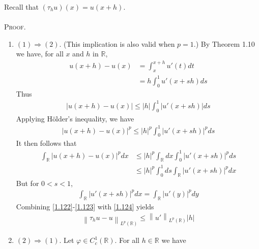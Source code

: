 \documentclass[a4paper,oneside]{book}
\numberwithin{equation}{chapter}
\begin{document}
Recall that $\left( {{\tau _h}u} \right)\left( x \right) = u\left( {x + h} \right)$.\\
\\
\textsc{Proof.} 
\begin{enumerate}
\item $\left( 1 \right) \Rightarrow \left( 2 \right)$. (This implication is also valid when $p=1$.) By Theorem 1.10 we have, for all $x$ and $h$ in $\mathbb{R}$,
\begin{align}
u\left( {x + h} \right) - u\left( x \right) &= \int_x^{x + h} {u'\left( t \right)dt} \\
 &= h\int_0^1 {u'\left( {x + sh} \right)ds} 
\end{align}
Thus
\begin{align}
\left| {u\left( {x + h} \right) - u\left( x \right)} \right| \le \left| h \right|\int_0^1 {\left| {u'\left( {x + sh} \right)} \right|ds} 
\end{align}
Applying H\"{o}lder's inequality, we have
\begin{align}
{\left| {u\left( {x + h} \right) - u\left( x \right)} \right|^p} \le {\left| h \right|^p}\int_0^1 {{{\left| {u'\left( {x + sh} \right)} \right|}^p}ds} 
\end{align}
It then follows that
\begin{align}
\label{1.122}
\int_{\mathbb{R}} {{{\left| {u\left( {x + h} \right) - u\left( x \right)} \right|}^p}dx}  &\le {\left| h \right|^p}\int_{\mathbb{R}} {dx\int_0^1 {{{\left| {u'\left( {x + sh} \right)} \right|}^p}ds} } \\
& \le {\left| h \right|^p}\int_0^1 {ds\int_{\mathbb{R}} {{{\left| {u'\left( {x + sh} \right)} \right|}^p}dx} }  \label{1.123}
\end{align}
But for $0<s<1$,
\begin{align}
\label{1.124}
\int_{\mathbb{R}} {{{\left| {u'\left( {x + sh} \right)} \right|}^p}dx}  = \int_{\mathbb{R}} {{{\left| {u'\left( y \right)} \right|}^p}dy} 
\end{align}
Combining \eqref{1.122}-\eqref{1.123} with \eqref{1.124} yields
\begin{align}
{\left\| {{\tau _h}u - u} \right\|_{{L^p}\left( \mathbb{R} \right)}} \le {\left\| {u'} \right\|_{{L^p}\left( \mathbb{R} \right)}}\left| h \right|
\end{align}
\item $\left( 2 \right) \Rightarrow \left( 1 \right)$. Let $\varphi  \in C_c^1\left( \mathbb{R} \right)$. For all $h\in \mathbb{R}$ we have
\begin{align}

\end{align}
\end{enumerate}
\end{document}
